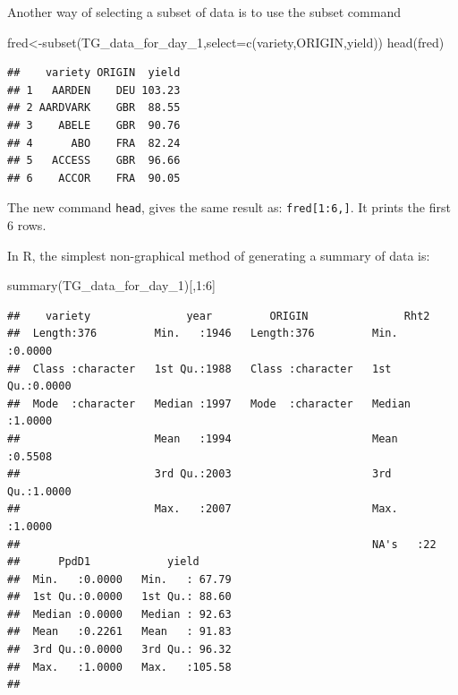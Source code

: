 \documentclass[
]{book}
\newenvironment{Shaded}{\begin{snugshade}}{\end{snugshade}}
\newcommand{\AttributeTok}[1]{\textcolor[rgb]{0.77,0.63,0.00}{#1}}
\newcommand{\DecValTok}[1]{\textcolor[rgb]{0.00,0.00,0.81}{#1}}
\newcommand{\FunctionTok}[1]{\textcolor[rgb]{0.00,0.00,0.00}{#1}}
\newcommand{\NormalTok}[1]{#1}
\newcommand{\OtherTok}[1]{\textcolor[rgb]{0.56,0.35,0.01}{#1}}
\newcommand{\SpecialCharTok}[1]{\textcolor[rgb]{0.00,0.00,0.00}{#1}}
\begin{document}
Another way of selecting a subset of data is to use the subset command

\begin{Shaded}
\begin{Highlighting}[]
\NormalTok{fred}\OtherTok{\textless{}{-}}\FunctionTok{subset}\NormalTok{(TG\_data\_for\_day\_1,}\AttributeTok{select=}\FunctionTok{c}\NormalTok{(variety,ORIGIN,yield))}
\FunctionTok{head}\NormalTok{(fred)}
\end{Highlighting}
\end{Shaded}

\begin{verbatim}
##    variety ORIGIN  yield
## 1   AARDEN    DEU 103.23
## 2 AARDVARK    GBR  88.55
## 3    ABELE    GBR  90.76
## 4      ABO    FRA  82.24
## 5   ACCESS    GBR  96.66
## 6    ACCOR    FRA  90.05
\end{verbatim}

The new command \texttt{head}, gives the same result as: \texttt{fred{[}1:6,{]}}. It prints the first 6 rows.

In R, the simplest non-graphical method of generating a summary of data is:

\begin{Shaded}
\begin{Highlighting}[]
\FunctionTok{summary}\NormalTok{(TG\_data\_for\_day\_1)[,}\DecValTok{1}\SpecialCharTok{:}\DecValTok{6}\NormalTok{]}
\end{Highlighting}
\end{Shaded}

\begin{verbatim}
##    variety               year         ORIGIN               Rht2       
##  Length:376         Min.   :1946   Length:376         Min.   :0.0000  
##  Class :character   1st Qu.:1988   Class :character   1st Qu.:0.0000  
##  Mode  :character   Median :1997   Mode  :character   Median :1.0000  
##                     Mean   :1994                      Mean   :0.5508  
##                     3rd Qu.:2003                      3rd Qu.:1.0000  
##                     Max.   :2007                      Max.   :1.0000  
##                                                       NA's   :22      
##      PpdD1            yield       
##  Min.   :0.0000   Min.   : 67.79  
##  1st Qu.:0.0000   1st Qu.: 88.60  
##  Median :0.0000   Median : 92.63  
##  Mean   :0.2261   Mean   : 91.83  
##  3rd Qu.:0.0000   3rd Qu.: 96.32  
##  Max.   :1.0000   Max.   :105.58  
## 
\end{verbatim}
\end{document}
